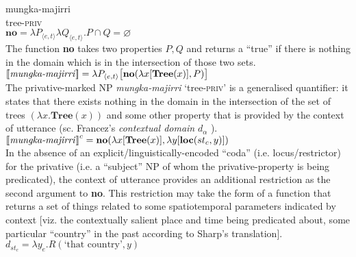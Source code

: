 \documentclass[output=paper,draft,draftmode,colorlinks,citecolor=brown]{langscibook}
\begin{document}
\begin{exe}\ex\label{ex:austr-truth-analysis} 
    \begin{xlist}
    \ex\gll mungka-majirri\\
tree-\textsc{priv}\\
%
\ex $\textbf{no}=\lambda P_{\langle e,t\rangle}\lambda Q_{\langle e,t\rangle}.P\cap Q=\varnothing$\\
The function \textbf{no} takes two properties $P,Q$ and returns a ``true'' if there is nothing in the domain which is in the intersection of those two sets.
\ex\label{privsemsF} $\mbox{$[\![\mbox{\textit{mungka-majirri}}]\!]$}=\lambda P_{\langle e,t\rangle}\big[\textbf{no}(\lambda x[\textbf{Tree}(x)],P)\big]$\\
The privative-marked NP \textit{mungka-majirri} `tree\textsc{-priv}' is a generalised quantifier: it states that there exists nothing in the domain in the intersection of the set of trees $(\lambda x.\textbf{Tree}(x))$ and some other property that is provided by the context of utterance (sc. Francez's \textit{contextual domain} $d_\alpha$ \citeyearpar[1838]{Francez2011}).
        \ex\label{ex:austr-truth-analysis-fourth} 
        $\mbox{$[\![\mbox{\textit{mungka-majirri}}]\!]$}^c=\textbf{no}(\lambda x[\textbf{Tree}(x)],\lambda y[\textbf{loc}(st_c,y)])$\\
In the absence of an explicit\slash linguistically-encoded ``coda'' (i.e.
        locus\slash restrictor) for the privative (i.e. a ``subject'' NP of
        whom the privative-property is being predicated), the context of
        utterance provides an additional restriction as the second argument
        to \textbf{no}. This restriction may take the form of a function
        that returns a set of things related to some spatiotemporal
        parameters indicated by context [viz. the contextually
        salient place and time being predicated about, some particular
        ``country'' in the past according to Sharp's translation].
    $d_{st_c}=\lambda y_e.R(\text{`that country'},y)$ \end{xlist}\end{exe}
\end{document}
